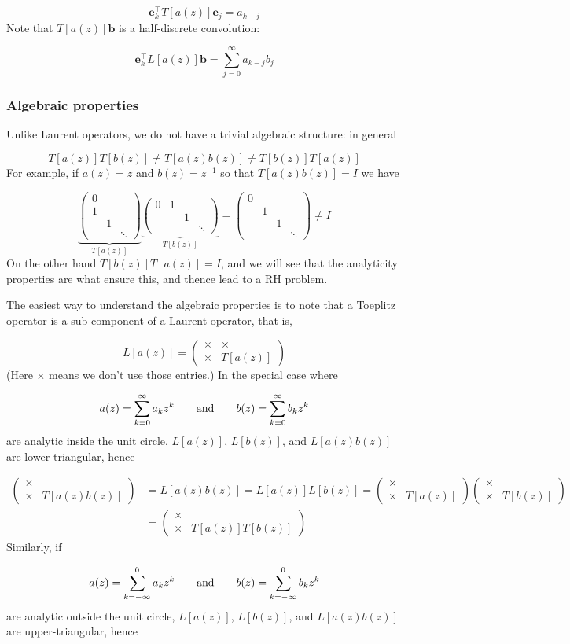 \documentclass[12pt,a4paper]{article}
\def\qqand{\qquad\hbox{and}\qquad}
\def\vc#1{ {\mathbf #1} }
\def\addtab#1={#1\;&=}
\def\ccr{\\\addtab}
\def\sopmatrix#1{ \begin{pmatrix}#1\end{pmatrix} }
\def\addtab#1={#1\;&=}
\def\ccr{\\\addtab}
\begin{document}
\[
\vc e_k^\top T[a(z)] \vc e_j = a_{k-j}
\]
Note that $T[a(z)] \vc b$ is a half-discrete convolution:

\[
\vc e_k^\top L[a(z)] \vc b = \sum_{j=0}^\infty a_{k-j} b_j
\]
\subsubsection{Algebraic properties}
Unlike Laurent operators, we do not have a trivial algebraic structure: in general

\[
T[a(z)] T[b(z)] \neq T[a(z) b(z)] \neq T[b(z)] T[a(z)]
\]
For example, if $a(z) = z$ and $b(z) = z^{-1}$ so that $T[a(z)b(z)] = I$ we have

\[
\underbrace{\sopmatrix{0 \\ 1 \\ & 1 \\ &&\ddots}}_{T[a(z)]} \underbrace{\sopmatrix{0 & 1 \\ & & 1 \\ &&&\ddots}}_{T[b(z)]} = \sopmatrix{0 \\ & 1 \\ && 1 \\ &&& \ddots} \neq I
\]
On the other hand $T[b(z)] T[a(z)] = I$, and we will see that the analyticity properties are what ensure this, and thence lead to a RH problem.

The easiest way to understand the algebraic properties is to note that a Toeplitz operator is a sub-component of a Laurent operator, that is,

\[
L[a(z)] = \sopmatrix{
\times & \times \\ \times & T[a(z)]
}
\]
(Here $\times$ means we don't use those entries.) In the special case where

\[
a(z) = \sum_{k=0}^\infty a_k z^k \qqand b(z) = \sum_{k=0}^\infty b_k z^k
\]
are analytic inside the unit circle, $L[a(z)]$, $L[b(z)]$, and $L[a(z) b(z)]$ are lower-triangular, hence


\begin{align*}
\sopmatrix{
\times &  \\ \times & T[a(z) b(z)]
} &= L[a(z)b(z)] = L[a(z)] L[b(z)] =  \sopmatrix{
\times &  \\ \times & T[a(z)]
} \sopmatrix{
\times &  \\ \times & T[b(z)]
} \ccr
= \sopmatrix{
\times &  \\ \times & T[a(z)] T[b(z)]
}
\end{align*}
Similarly, if

\[
a(z) = \sum_{k=-\infty}^0 a_k z^k \qqand b(z) = \sum_{k=-\infty}^0 b_k z^k
\]
are analytic outside the unit circle, $L[a(z)]$, $L[b(z)]$, and $L[a(z) b(z)]$ are upper-triangular, hence
\end{document}
